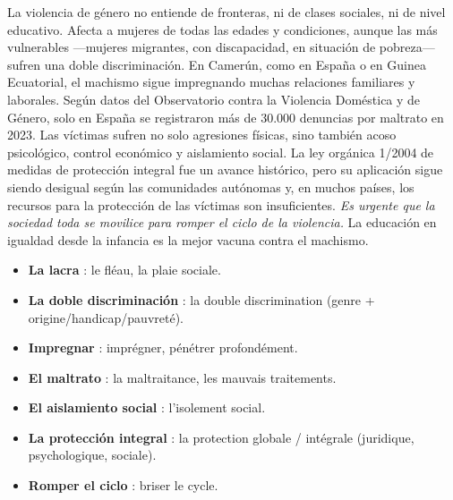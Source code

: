 \documentclass[11pt]{article}
\newcounter{popsec}
\newcounter{popsub}
\newcommand{\courssub}[1]{%
  \stepcounter{popsub}%
  \par\vspace{9pt}\noindent{\popxbold\fontsize{11.5}{13}\selectfont\color{popink}{\color{poporange}\thepopsec.\thepopsub}\hspace{6pt}#1}\par\nopagebreak\vspace{4pt}
}
\begin{document}
\begin{textebox}
La violencia de género no entiende de fronteras, ni de clases sociales, ni de nivel educativo. Afecta a mujeres de todas las edades y condiciones, aunque las más vulnerables —mujeres migrantes, con discapacidad, en situación de pobreza— sufren una doble discriminación. En Camerún, como en España o en Guinea Ecuatorial, el machismo sigue impregnando muchas relaciones familiares y laborales. Según datos del Observatorio contra la Violencia Doméstica y de Género, solo en España se registraron más de 30.000 denuncias por maltrato en 2023. Las víctimas sufren no solo agresiones físicas, sino también acoso psicológico, control económico y aislamiento social. La ley orgánica 1/2004 de medidas de protección integral fue un avance histórico, pero su aplicación sigue siendo desigual según las comunidades autónomas y, en muchos países, los recursos para la protección de las víctimas son insuficientes. \emph{Es urgente que la sociedad toda se movilice para romper el ciclo de la violencia.} La educación en igualdad desde la infancia es la mejor vacuna contra el machismo.
\end{textebox}

\begin{definition}
\begin{itemize}
\item \textbf{La lacra} : le fléau, la plaie sociale.
\item \textbf{La doble discriminación} : la double discrimination (genre + origine/handicap/pauvreté).
\item \textbf{Impregnar} : imprégner, pénétrer profondément.
\item \textbf{El maltrato} : la maltraitance, les mauvais traitements.
\item \textbf{El aislamiento social} : l'isolement social.
\item \textbf{La protección integral} : la protection globale / intégrale (juridique, psychologique, sociale).
\item \textbf{Romper el ciclo} : briser le cycle.
\end{itemize}
\end{definition}

\courssub{Compréhension du texte}
\end{document}

